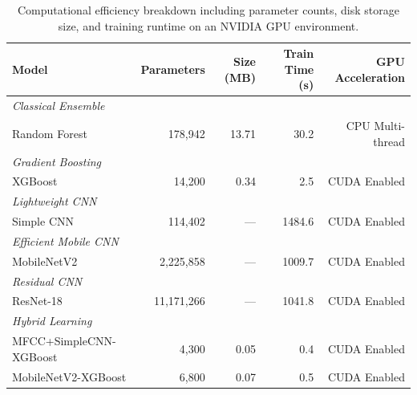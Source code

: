\begin{table}[ht]
  \centering
  \caption{Computational efficiency breakdown including parameter counts, disk storage size, and training runtime on an NVIDIA GPU environment.}
  \label{tab:efficiency}
  \begin{tabular}{lrrrr}
    \toprule
    \textbf{Model} & \textbf{Parameters} & \textbf{Size (MB)} & \textbf{Train Time (s)} & \textbf{GPU Acceleration} \\
    \midrule
    \multicolumn{5}{l}{\textit{Classical Ensemble}} \\
    Random Forest & 178,942 & 13.71 & 30.2 & CPU Multi-thread \\
    \midrule
    \multicolumn{5}{l}{\textit{Gradient Boosting}} \\
    XGBoost & 14,200 & 0.34 & 2.5 & CUDA Enabled \\
    \midrule
    \multicolumn{5}{l}{\textit{Lightweight CNN}} \\
    Simple CNN & 114,402 & --- & 1484.6 & CUDA Enabled \\
    \midrule
    \multicolumn{5}{l}{\textit{Efficient Mobile CNN}} \\
    MobileNetV2 & 2,225,858 & --- & 1009.7 & CUDA Enabled \\
    \midrule
    \multicolumn{5}{l}{\textit{Residual CNN}} \\
    ResNet-18 & 11,171,266 & --- & 1041.8 & CUDA Enabled \\
    \midrule
    \multicolumn{5}{l}{\textit{Hybrid Learning}} \\
    MFCC+SimpleCNN-XGBoost & 4,300 & 0.05 & 0.4 & CUDA Enabled \\
    MobileNetV2-XGBoost & 6,800 & 0.07 & 0.5 & CUDA Enabled \\
    \bottomrule
  \end{tabular}
\end{table}
